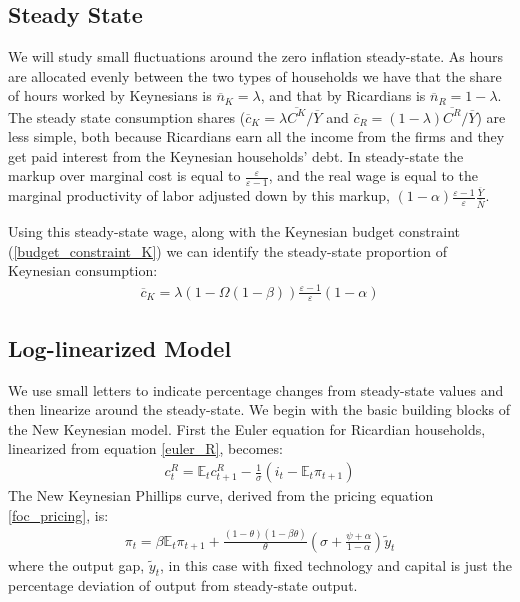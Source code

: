 \documentclass[titlepage]{\econtex}\newcommand{\texname}{ConsumptionHeterogeneity}
\begin{document}
\subsection{Steady State}
We will study small fluctuations around the zero inflation steady-state. As hours are allocated evenly between the two types of households we have that the share of hours worked by Keynesians is $\overline{n}_{K} = \lambda$, and that by Ricardians is $\overline{n}_{R} = 1-\lambda$. The steady state consumption shares ($\overline{c}_{K} = \lambda\overline{C^K}/\overline{Y}$ and $\overline{c}_{R} = (1-\lambda)\overline{C^R}/\overline{Y}$) are less simple, both because Ricardians earn all the income from the firms and they get paid interest from the Keynesian households' debt. In steady-state the markup over marginal cost is equal to $\frac{\varepsilon}{\varepsilon-1}$, and the real wage is equal to the marginal productivity of labor adjusted down by this markup, $(1-\alpha) \frac{\varepsilon-1}{\varepsilon}\frac{\overline{Y}}{\overline{N}}$. 

Using this steady-state wage, along with the Keynesian budget constraint (\ref{budget_constraint_K}) we can identify the steady-state proportion of Keynesian consumption:
\begin{align}
\overline{c}_{K} = \lambda \left(1-\Omega(1-\beta)\right)\frac{\varepsilon-1}{\varepsilon}(1-\alpha) \label{c_K_ss}
\end{align}

\subsection{Log-linearized Model}
We use small letters to indicate percentage changes from steady-state values and then linearize around the steady-state. We begin with the basic building blocks of the New Keynesian model. First the Euler equation for Ricardian households, linearized from equation \ref{euler_R}, becomes:
\begin{align}
c^R_t = \mathbb{E}_t c^R_{t+1} - \frac{1}{\sigma}(i_t - \mathbb{E}_t\pi_{t+1}) \label{euler_R_linear}
\end{align}
The New Keynesian Phillips curve, derived from the pricing equation \ref{foc_pricing}, is:
\begin{align}
\pi_t=\beta \mathbb{E}_t\pi_{t+1}+\frac{(1-\theta)(1-\beta\theta)}{\theta}\left(\sigma +  \frac{\psi + \alpha}{1-\alpha} \right)\tilde{y}_t \label{NKphillips_linear}
\end{align}
where the output gap, $\tilde{y}_t$, in this case with fixed technology and capital is just the percentage deviation of output from steady-state output.
\end{document}
